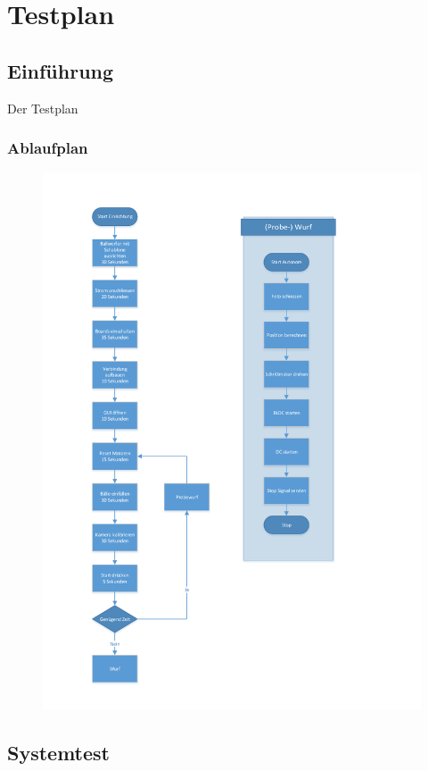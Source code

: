 \section{Testplan}

\subsection{Einführung}

Der Testplan

\subsubsection{Ablaufplan}
\begin{figure}
	\centering
	\includegraphics[width=0.9\linewidth]{../../fig/ablauf-ballwurf}
	\caption{}
	\label{fig:ablauf-ballwurf}
\end{figure}

\subsection{Systemtest}


